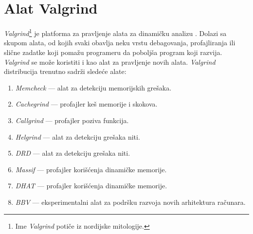 \documentclass[12pt,oneside]{memoir}
\theoremstyle{plain}
\theoremstyle{definition}
\begin{document}
\chapter{Alat Valgrind}
\textit{Valgrind}\footnote{ Ime \textit{Valgrind} potiče iz nordijske mitologije.} je platforma za pravljenje alata za dinamičku analizu \cite{Valgrind}. Dolazi sa skupom alata, od kojih svaki obavlja neku vrstu debagovanja, profajliranja ili slične zadatke koji pomažu programeru da poboljša program koji razvija. \textit{Valgrind} se može koristiti i kao alat za pravljenje novih alata. 
\textit{Valgrind} distribucija trenutno sadrži sledeće alate:
\begin{enumerate}
  \item \textit{Memcheck} \cite{ValgrindDOC} --- alat za detekciju memorijskih grešaka.
  \item \textit{Cachegrind}  \cite{Cachegrind} --- profajler keš memorije i skokova. 
  \item \textit{Callgrind} \cite{Callgrind} --- profajler poziva funkcija.
  \item \textit{Helgrind} \cite{Helgrind} --- alat za detekciju grešaka niti.
  \item \textit{DRD} \cite{Drd} --- alat za detekciju grešaka niti. 
  \item \textit{Massif} \cite{Massif} --- profajler korišćenja dinamičke memorije.
  \item \textit{DHAT} \cite{DHAT} --- profajler korišćenja dinamičke memorije. %
  \item \textit{BBV} \cite{BBV} --- eksperimentalni alat za podršku razvoja novih arhitektura računara. %
\end{enumerate}
\end{document}
